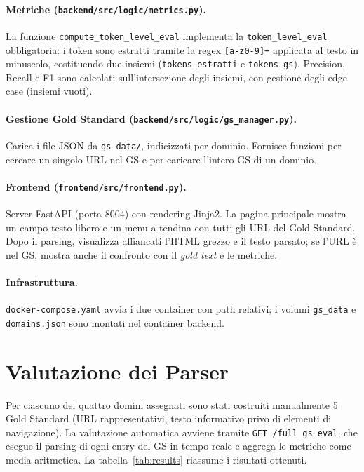 \documentclass[11pt]{article}
\begin{document}
\paragraph{Metriche (\texttt{backend/src/logic/metrics.py}).}
La funzione \texttt{compute\_token\_level\_eval} implementa la \texttt{token\_level\_eval} obbligatoria: i token sono estratti tramite la regex \texttt{[a-z0-9]+} applicata al testo in minuscolo, costituendo due insiemi (\texttt{tokens\_estratti} e \texttt{tokens\_gs}). Precision, Recall e F1 sono calcolati sull'intersezione degli insiemi, con gestione degli edge case (insiemi vuoti).

\paragraph{Gestione Gold Standard (\texttt{backend/src/logic/gs\_manager.py}).}
Carica i file JSON da \texttt{gs\_data/}, indicizzati per dominio. Fornisce funzioni per cercare un singolo URL nel GS e per caricare l'intero GS di un dominio.

\paragraph{Frontend (\texttt{frontend/src/frontend.py}).}
Server FastAPI (porta 8004) con rendering Jinja2. La pagina principale mostra un campo testo libero e un menu a tendina con tutti gli URL del Gold Standard. Dopo il parsing, visualizza affiancati l'HTML grezzo e il testo parsato; se l'URL è nel GS, mostra anche il confronto con il \textit{gold text} e le metriche.

\paragraph{Infrastruttura.}
\texttt{docker-compose.yaml} avvia i due container con path relativi; i volumi \texttt{gs\_data} e \texttt{domains.json} sono montati nel container backend.

\section{Valutazione dei Parser}

Per ciascuno dei quattro domini assegnati sono stati costruiti manualmente 5 Gold Standard (URL rappresentativi, testo informativo privo di elementi di navigazione). La valutazione automatica avviene tramite \texttt{GET /full\_gs\_eval}, che esegue il parsing di ogni entry del GS in tempo reale e aggrega le metriche come media aritmetica. La tabella~\ref{tab:results} riassume i risultati ottenuti.
\end{document}
